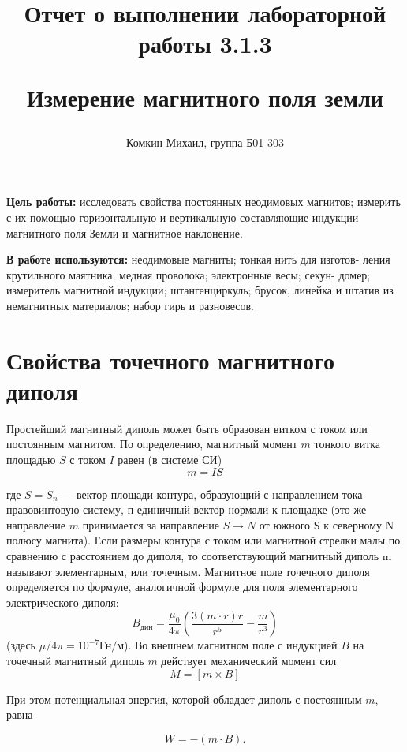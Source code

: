 \documentclass[12pt,a4paper]{article}
\title{
Отчет о выполнении лабораторной работы 3.1.3

Измерение магнитного поля земли 
}
\author{Комкин Михаил, группа Б01-303}
\begin{document}
\maketitle

\textbf{Цель работы:} исследовать свойства постоянных неодимовых магнитов; измерить с их помощью горизонтальную и вертикальную составляющие индукции магнитного 
поля Земли и магнитное наклонение.

\textbf{В работе используются:} неодимовые магниты; тонкая нить для изготов- ления крутильного маятника; медная проволока; электронные весы; секун- домер; измеритель 
магнитной индукции; штангенциркуль; брусок, линейка и штатив из немагнитных материалов; набор гирь и разновесов.


\section{Свойства точечного магнитного диполя}
Простейший магнитный диполь может быть образован витком с током или постоянным магнитом. По определению, магнитный момент $m$ тонкого витка площадью 
$S$ с током $I$ равен (в системе СИ)
\begin{equation}
    m = IS
\end{equation}
\label{moment}

где $S = S_n$ — вектор площади контура, образующий с направлением тока правовинтовую систему, п единичный вектор нормали к площадке (это же направление $m$ принимается 
за направление $S \to N$ от южного $Ѕ$ к северному N полюсу магнита). Если размеры контура с током или магнитной стрелки малы по сравнению с расстоянием до диполя, 
то соответствующий магнитный диполь m называют элементарным, или точечным.
Магнитное поле точечного диполя определяется по формуле, аналогичной формуле для поля элементарного электрического диполя:
\begin{equation}
    B_\text{дин} = \frac{\mu_0}{4 \pi} \left(\frac{3(m \cdot r)r}{r^5} - \frac{m}{r^3}\right)
\end{equation}
\label{dipol}
(здесь $\mu/4\pi = 10^{-7} \text{Гн/м}$).    
    Во внешнем магнитном поле с индукцией $B$ на точечный магнитный диполь $m$ действует механический момент сил 
\begin{equation}
    M = [m \times B]
\end{equation} 
\label{mehmoment}

При этом потенциальная энергия, которой обладает диполь с постоянным $m$, равна

\begin{equation}
    W = - (m \cdot B).
\end{equation}
\label{energy}
\end{document}
